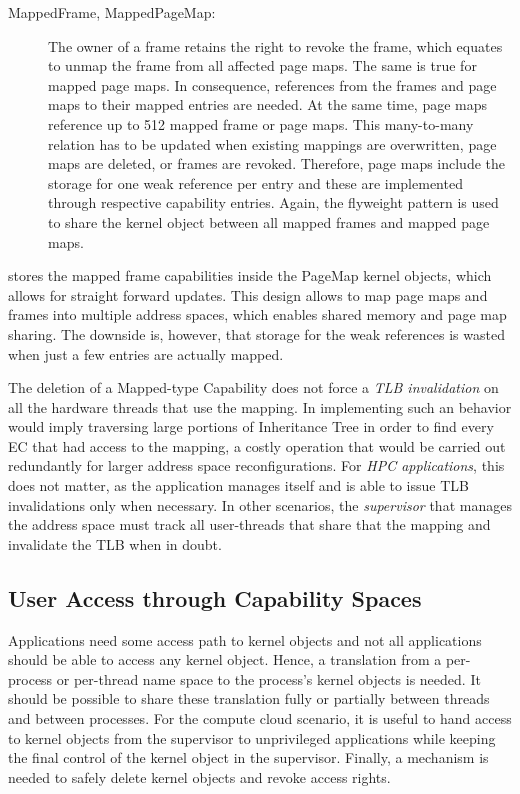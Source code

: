 \begin{description}
\item[MappedFrame, MappedPageMap:] 
The owner of a frame retains the right to revoke the frame, which equates to unmap the frame from all affected page maps. The same is true for mapped page maps. In consequence, references from the frames and page maps to their mapped entries are needed. At the same time, page maps reference up to 512 mapped frame or page maps. This many-to-many relation has to be updated when existing mappings are overwritten, page maps are deleted, or frames are revoked. 
Therefore, \mythos page maps include the storage for one weak reference per entry and these are implemented through respective capability entries. 
Again, the flyweight pattern is used to share the kernel object between all mapped frames and mapped page maps. 
\end{description}

\mythos stores the mapped frame capabilities inside the PageMap kernel objects, which allows for straight forward updates. This design allows to map page maps and frames into multiple address spaces, which enables shared memory and page map sharing. The downside is, however, that storage for the weak references is wasted when just a few entries are actually mapped.

The deletion of a Mapped-type Capability does not force a \emph{TLB invalidation} on all the hardware threads that use the mapping. In implementing such an behavior would imply traversing large portions of Inheritance Tree in order to find every EC that had access to the mapping, a costly operation that would be carried out redundantly for larger address space reconfigurations.
For \emph{HPC applications}, this does not matter, as the application manages itself and is able to issue TLB invalidations only when necessary.
In other scenarios, the \emph{supervisor} that manages the address space must track all user-threads that share that the mapping and invalidate the TLB when in doubt.

\subsection{User Access through Capability Spaces}
\label{sec:log:capability-spaces}

Applications need some access path to kernel objects and not all applications should be able to access any kernel object. Hence, a translation from a per-process or per-thread name space to the process's kernel objects is needed. It should be possible to share these translation fully or partially between threads and between processes. For the compute cloud scenario, it is useful to hand access to kernel objects from the supervisor to unprivileged applications while keeping the final control of the kernel object in the supervisor. Finally, a mechanism is needed to safely delete kernel objects and revoke access rights.

